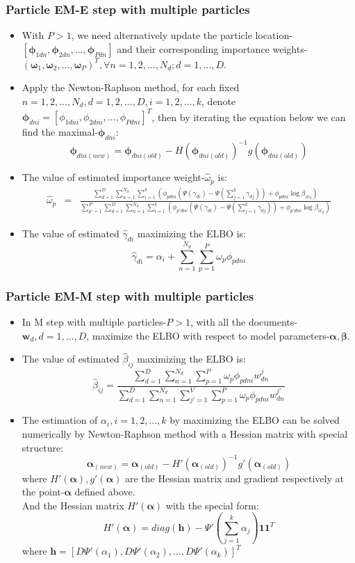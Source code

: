 \documentclass[10pt]{beamer}
\newcommand{\be}{\begin{equation}}
\newcommand{\ee}{\end{equation}}
\newcommand{\bi}{\begin{itemize}}
\newcommand{\ei}{\end{itemize}}
\newcommand{\bs}{\boldsymbol}
\newcommand{\ba}{\begin{array}}
\newcommand{\ea}{\end{array}}
\begin{document}
\begin{frame}
	\frametitle{Particle EM-E step with multiple particles}
	\bi
	\item With $P>1$, we need alternatively update the particle location-$[\bs{\phi}_{1dn},\bs{\phi}_{2dn},\ldots,\bs{\phi}_{Pdn}]$ and their corresponding importance weights-$(\bs{\omega}_{1},\bs{\omega}_{2},\ldots,\bs{\omega}_{P})^T,\forall n=1,2,\ldots,N_d; d=1,\ldots,D$.
	\item Apply the Newton-Raphson method, for each fixed $n=1,2,\ldots,N_d, d=1,2,\ldots,D, i=1,2,\ldots,k$, denote $\bs{\phi}_{dni}=[\phi_{1dni},\phi_{2dni},\ldots,\phi_{Pdni}]^T$, then by iterating the equation below we can find the maximal-$\bs{\phi}_{dni}$:\\
	\[
	\bs{\phi}_{dni(new)}=\bs{\phi}_{dni(old)}-H(\bs{\phi}_{dni(old)})^{-1}g(\bs{\phi}_{dni(old)})
	\]
	\item The value of estimated importance weight-$\hat{\omega}_p$ is:
	\be\label{omg3}
	\ba{rcl}
	\hat{\omega}_p
	&=&\frac{\sum_{d=1}^{D}\sum_{n=1}^{N_d}\sum_{i=1}^{k}\left(\phi_{pdni}(\Psi(\gamma_{di})-\Psi(\sum_{j=1}^{k}\gamma_{dj}))+\phi_{pdni}\log\beta_{iv_d}\right)}{\sum_{p'=1}^{P}\sum_{d=1}^{D}\sum_{n=1}^{N_d}\sum_{i=1}^{k}\left(\phi_{p'dni}(\Psi(\gamma_{di})-\Psi(\sum_{j=1}^{k}\gamma_{dj}))+\phi_{p'dni}\log\beta_{iv_d}\right)}
	\ea
	\ee
	\item The value of estimated $\hat{\gamma}_{di}$ maximizing the ELBO is:\\
	\[
\hat{\gamma}_{di}=\alpha_i+\sum_{n=1}^{N_d}\sum_{p=1}^{P}\omega_{p}\phi_{pdni}
	\]
	\ei
\end{frame}	


	\begingroup
	\small%
\begin{frame}
	\frametitle{Particle EM-M step with multiple particles}
	\bi
	\item In M step with multiple particles-$P>1$, with all the documents- $\bs{w}_d,d=1,\ldots,D$, maximize the ELBO with respect to model parameters-$\bs{\alpha,}\bs{\beta}$.
	\item The value of estimated $\hat{\beta}_{ij}$ maximizing the ELBO is:
	\[
	\hat{\beta}_{ij}=\frac{\sum_{d=1}^{D}\sum_{n=1}^{N_d}\sum_{p=1}^{P}\omega_{p}\phi_{pdni}w_{dn}^j}{\sum_{d=1}^{D}\sum_{n=1}^{N_d}\sum_{j'=1}^{V}\sum_{p=1}^{P}\omega_{p}\phi_{pdni}w_{dn}^{j'}}
	\]
		\item The estimation of $\alpha_{i},i=1,2,\ldots,k$ by maximizing the ELBO can be solved numerically by Newton-Raphson method with a Hessian matrix with special structure:
		\[
		\bs{\alpha}_{(new)}=\bs{\alpha}_{(old)}-H'(\bs{\alpha}_{(old)})^{-1}g'(\bs{\alpha}_{(old)})
		\]
		where $H'(\bs{\alpha}),g'(\bs{\alpha})$ are the Hessian matrix and gradient respectively at the point-$\bs{\alpha}$ defined above.\\
		And the Hessian matrix $H'(\bs{\alpha})$ with the special form:\\
		\[
		H'(\bs{\alpha})=diag(\bs{h})-\Psi'(\sum_{j=1}^{k}\alpha_j)\bs{1}\bs{1}^T
		\]
		where $\bs{h}=[D\Psi'(\alpha_1),D\Psi'(\alpha_2),\ldots,D\Psi'(\alpha_k)]^T$\\
	\ei
\end{frame}	
\endgroup	
\end{document}
